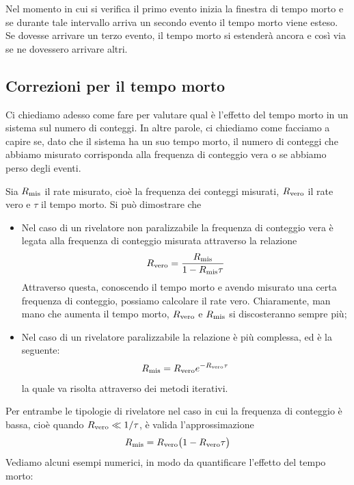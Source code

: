 Nel momento in cui si verifica il primo evento inizia la finestra di tempo morto e se durante tale intervallo arriva un secondo evento il tempo morto viene esteso. Se dovesse arrivare un terzo evento, il tempo morto si estenderà ancora e così via se ne dovessero arrivare altri. 

\subsection{Correzioni per il tempo morto}

Ci chiediamo adesso come fare per valutare qual è l'effetto del tempo morto in un sistema sul numero di conteggi. In altre parole, ci chiediamo come facciamo a capire se, dato che il sistema ha un suo tempo morto, il numero di conteggi che abbiamo misurato corrisponda alla frequenza di conteggio vera o se abbiamo perso degli eventi.

Sia $R_{\rm mis}$ il rate misurato, cioè la frequenza dei conteggi misurati, $R_{\rm vero}$ il rate vero e $\tau$ il tempo morto. Si può dimostrare che
\begin{itemize}[leftmargin=0.5cm]
   \item Nel caso di un rivelatore non paralizzabile la frequenza di conteggio vera è legata alla frequenza di conteggio misurata attraverso la relazione
   \begin{equation*}
      R_{\rm vero}=\frac{R_{\rm mis}}{1 - R_{\rm mis} \tau}
   \end{equation*}
   Attraverso questa, conoscendo il tempo morto e avendo misurato una certa frequenza di conteggio, possiamo calcolare il rate vero. Chiaramente, man mano che aumenta il tempo morto, $R_{\rm vero}$ e $R_{\rm mis}$ si discosteranno sempre più;
   \item Nel caso di un rivelatore paralizzabile la relazione è più complessa, ed è la seguente:
   \begin{equation*}
      R_{\rm mis}=R_{\rm vero}e^{-R_{\rm vero} \tau}
   \end{equation*}
   la quale va risolta attraverso dei metodi iterativi.
\end{itemize}
Per entrambe le tipologie di rivelatore nel caso in cui la frequenza di conteggio è bassa, cioè quando $R_{\rm vero} \ll 1/\tau$, è valida l'approssimazione
\begin{equation*}
   R_{\rm mis}=R_{\rm vero}\bigl( 1 - R_{\rm vero} \tau \bigr)
\end{equation*}
Vediamo alcuni esempi numerici, in modo da quantificare l'effetto del tempo morto:


